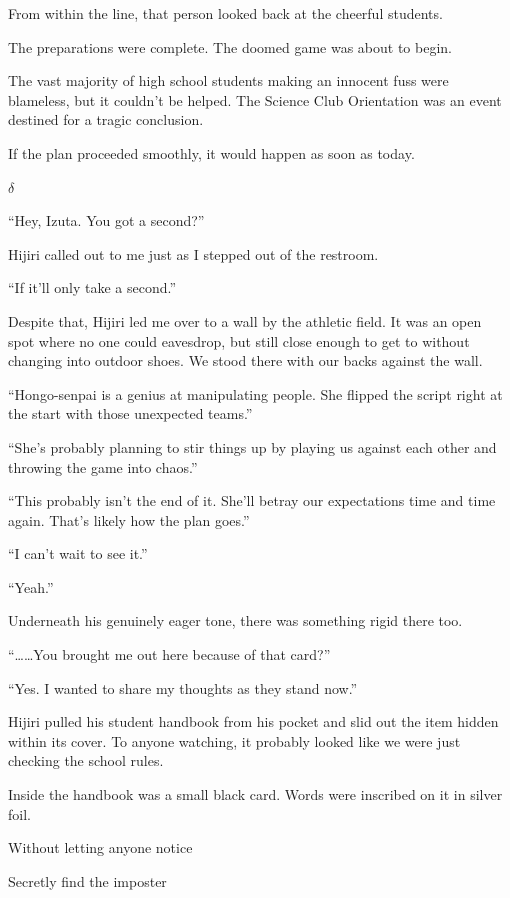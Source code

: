 \documentclass[
    a4paper,
    12pt,
    twoside,
    openany,
    UTF8,
    fontset=windows
]{ctexbook}
\begin{document}
From within the line, that person looked back at the cheerful students.

The preparations were complete. The doomed game was about to begin.

The vast majority of high school students making an innocent fuss were blameless, but it couldn't be helped. The Science Club Orientation was an event destined for a tragic conclusion.

If the plan proceeded smoothly, it would happen as soon as today.

$\delta$

``Hey, Izuta. You got a second?''

Hijiri called out to me just as I stepped out of the restroom.

``If it'll only take a second.''

Despite that, Hijiri led me over to a wall by the athletic field. It was an open spot where no one could eavesdrop, but still close enough to get to without changing into outdoor shoes. We stood there with our backs against the wall.

``Hongo-senpai is a genius at manipulating people. She flipped the script right at the start with those unexpected teams.''

``She's probably planning to stir things up by playing us against each other and throwing the game into chaos.''

``This probably isn't the end of it. She'll betray our expectations time and time again. That's likely how the plan goes.''

``I can't wait to see it.''

``Yeah.''

Underneath his genuinely eager tone, there was something rigid there too.

``\dots\dots You brought me out here because of that card?''

``Yes. I wanted to share my thoughts as they stand now.''

Hijiri pulled his student handbook from his pocket and slid out the item hidden within its cover. To anyone watching, it probably looked like we were just checking the school rules.

Inside the handbook was a small black card. Words were inscribed on it in silver foil.

\begin{center}
Without letting anyone notice

Secretly find the imposter
\end{center}
\end{document}
